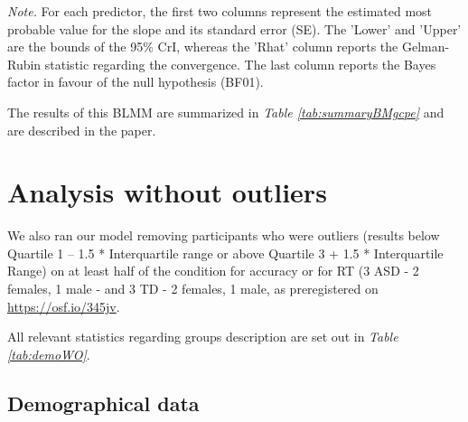 \documentclass[
  11pt,
  english,
  ,doc,floatsintext]{apa6}
\begin{document}
\begin{table}[!h]
\begin{center}
\begin{threeparttable}
{}

\begin{tablenotes}[para]
\normalsize{\textit{Note.} For each predictor, the first two columns represent the estimated
    most probable value for the slope and its standard error (SE). The 'Lower' and 'Upper' are the bounds of the 95\% CrI, whereas the 'Rhat' column reports the Gelman-Rubin statistic regarding the convergence. The last column reports the Bayes factor in favour of the null hypothesis (BF01).}
\end{tablenotes}

\end{threeparttable}
\end{center}

\end{table}

The results of this BLMM are summarized in \emph{Table \ref{tab:summaryBMgcpe}} and are described in the paper.

\newpage

\hypertarget{analysis-without-outliers}{%
\section{Analysis without outliers}\label{analysis-without-outliers}}

We also ran our model removing participants who were outliers (results below Quartile 1 -- 1.5 * Interquartile range or above Quartile 3 + 1.5 * Interquartile Range) on at least half of the condition for accuracy or for RT (3 ASD - 2 females, 1 male - and 3 TD - 2 females, 1 male, as preregistered on \url{https://osf.io/345jv}.

All relevant statistics regarding groups description are set out in \emph{Table \ref{tab:demoWO}}.

\hypertarget{demographical-data}{%
\subsection{Demographical data}\label{demographical-data}}
\end{document}

